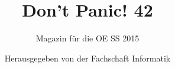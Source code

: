 \begin{titlepage}

\thispagestyle{empty}
\title{\Huge{Don't Panic! 42}}
\author{Magazin für die OE SS 2015}
\date{Herausgegeben von der Fachschaft Informatik}


%

\maketitle
\newpage
\end{titlepage}
